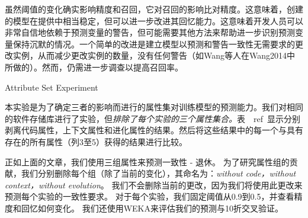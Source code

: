 虽然阈值的变化确实影响精度和召回，它对召回的影响比对精度。这意味着，创建的模型在提供中相当稳定，但可以进一步改进其回忆能力。这意味着开发人员可以非常自信地依赖于预测变量的警告，但可能需要其他方法来帮助进一步识别预测变量保持沉默的情况。一个简单的改进是建立模型以预测和警告一致性无需要求的更改实例，从而减少更改实例的数量，没有任何警告（如Wang等人在\cite{}{Wang2014}中所做的）。然而，仍需进一步调查以提高召回率。

{Attribute Set Experiment}

本实验是为了确定三者的影响而进行的属性集对训练模型的预测能力。我们对相同的软件存储库进行了实验，但{\em 排除了每个实验的三个属性集合。}表~\ ref{}~显示分别剥离代码属性，上下文属性和进化属性的结果。然后将这些结果中的每一个与具有存在的所有属性（列3至5）获得的结果进行比较。

正如上面的文章，我们使用{三组属性}来预测一致性 - 退休。 为了研究属性组的贡献，我们分别删除每个组（除了当前的变化），其命名为：{\em without code，without context，without evolution}。 我们不会删除当前的更改，因为我们将使用此更改来预测每个实验的一致性要求。 对于每个实验，我们固定阈值从0.9到0.5，并查看精度和回忆如何变化。 我们还使用WEKA来评估我们的预测与10折交叉验证。

